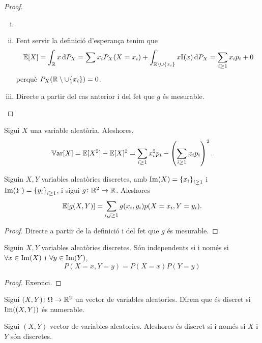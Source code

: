\begin{proof}
    \begin{enumerate}[i)]
        \item[]
        \item Fent servir la definició d'esperança tenim que
	  \[ \esp[X] = \int_{\real}{x\dif P_X} = \sum{x_i P_X(X=x_i) + \int_{\real\setminus\cup\{x_i\}}{x\mathbb{I}(x) \dif P_X}} = \sum_{i \ge 1}{x_i p_i} + 0\]
            perquè $P_X(\mathbb{R}\setminus\cup\{x_i\}) = 0$.
        \item Directe a partir del cas anterior i del fet que $g$ és mesurable.
    \end{enumerate}
\end{proof}

\begin{obs}
    Sigui $X$ una variable aleatòria. Aleshores,
    \[\operatorname{\mathbb{V}ar}[X] = \operatorname{\mathbb{E}}[X^2] - \operatorname{\mathbb{E}}[X]^2 = \sum_{i \ge 1}{x_i^2 p_i} - \left(\sum_{i \ge 1}{x_i p_i}\right)^2.\]
\end{obs}

\begin{prop}
    Siguin $X, Y$ variables aleatòries discretes, amb $\operatorname{Im}(X) = \left\{ x_i \right\}_{i \ge 1}$ i $\operatorname{Im}(Y) = \left\{ y_i \right\}_{i \ge 1}$, i sigui $g\colon \mathbb{R}^2\to\mathbb{R}$. Aleshores
    \[\operatorname{\mathbb{E}}[g(X,Y)] = \sum_{i,j \ge 1}{g(x_i,y_i) p(X=x_i, Y=y_i)}.\]
\end{prop}
\begin{proof}
    Directe a partir de la definició i del fet que $g$ és mesurable.
\end{proof}


\begin{prop}
    Siguin $X,Y$ variables aleatòries discretes. Són independents si i només si $\forall x \in\operatorname{Im}(X)$ i $\forall y \in\operatorname{Im}(Y)$,
    \[P(X=x, Y=y) = P(X=x)P(Y=y)\]
\end{prop}
\begin{proof}
    Exercici.
\end{proof}


\begin{defi}
    Sigui $(X,Y)\colon \Omega\to\mathbb{R}^2$ un vector de variables aleatories. Direm que és discret si $\operatorname{Im}((X,Y))$ és numerable.
\end{defi}

\begin{obs}
    Sigui $(X,Y)$ vector de variables aleatories. Aleshores és discret si i només si $X$ i $Y$ són discretes.
\end{obs}

